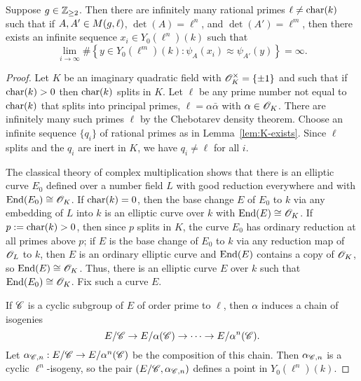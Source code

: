 \documentclass{amsart}
\begin{document}
\begin{proposition}\label{prop:lim-degree}
Suppose $g\in\mathbb{Z}_{\ge 2}$. %
  Then there are infinitely many rational primes $\ell\neq\operatorname{char}(k)$ such that if
   $A,A' \in M(g,\ell)$, $\det(A) = \ell^n$, and $\det(A') = \ell^m$,
  then there exists an infinite sequence $x_i \in Y_0(\ell^n)(k)$ such that
  \[
    \lim_{i \to \infty}\#\left\{ y \in Y_0(\ell^m)(k) \colon \psi_A(x_i) \approx \psi_{A'}(y) \right\} = \infty.
  \]
\end{proposition}
\begin{proof}
  Let $K$ be an imaginary quadratic field %
with $\mathscr{O}_K^\times = \{\pm 1\}$ and such that if $\operatorname{char}(k) > 0$ then $\operatorname{char}(k)$ splits in $K$.
Let $\ell$ be any prime number not equal to $\operatorname{char}(k)$ that splits into principal primes, $\ell = \alpha{\bar \alpha}$ with $ \alpha\in \mathscr{O}_K$.
There are infinitely many such primes $\ell$ by the Chebotarev density theorem.
Choose an infinite sequence $\{q_i\}$ of rational primes as in Lemma~\ref{lem:K-exists}. Since $\ell$ splits and the $q_i$ are
inert in $K$, we have $q_i\ne \ell$ for all $i$. %

  The classical theory of complex multiplication shows that there is an elliptic curve $E_0$ defined over a number field $L$ with good reduction everywhere and with $\operatorname{End}(E_0) \cong \mathscr{O}_K$.
  If $\operatorname{char}(k) = 0$, then the base change $E$ of $E_0$ to $k$ via any embedding of $L$ into $k$ is an elliptic curve over $k$ with $\operatorname{End}(E) \cong \mathscr{O}_K$.
  If $p:= \operatorname{char}(k) > 0$, then since $p$ splits in $K$, the curve $E_0$ has ordinary reduction at all primes above $p$;
   if $E$ is the base change of $E_0$ to $k$ via any reduction map of $\mathscr{O}_L$ to $k$, then $E$ is an ordinary elliptic curve and $\operatorname{End}(E)$ contains a copy of $\mathscr{O}_K$, so $\operatorname{End}(E) \cong \mathscr{O}_K$. Thus, there is an elliptic curve $E$ over $k$ such that $\operatorname{End}(E_0) \cong \mathscr{O}_K$.
  Fix such a curve $E$.

  If $\mathscr{C}$ is a cyclic subgroup of $E$ of order prime to $\ell$, then $\alpha$ induces a chain of isogenies
  \[
    E/\mathscr{C} \to E/\alpha(\mathscr{C}) \to \cdots \to E/\alpha^n(\mathscr{C}).
  \]
  Let $\alpha_{\mathscr{C},n}: E/\mathscr{C} \to E/\alpha^n(\mathscr{C})$ be the composition of this chain. Then $\alpha_{\mathscr{C},n}$ is a cyclic $\ell^n$-isogeny, so the pair $(E/\mathscr{C},\alpha_{\mathscr{C},n})$ defines a point in $Y_0(\ell^n)(k)$.


\end{proof}
\end{document}
